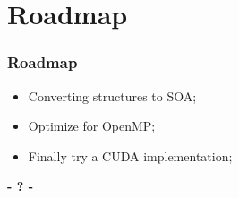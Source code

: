 \documentclass{beamer}
\begin{document}
\section{Roadmap}

\begin{frame}
\frametitle{Roadmap}
	\begin{center}	
	\begin{itemize}		
		\item Converting structures to SOA;
		\item Optimize for OpenMP;
		\item Finally try a CUDA implementation;
	\end{itemize}
	\end{center}
\end{frame}

\begin{frame}
\titlepage
	\begin{center}
		\Huge\bfseries
		- ? -
	\end{center}
\end{frame}
\end{document}
